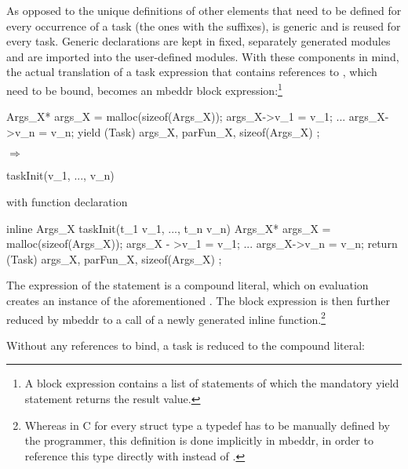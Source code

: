 As opposed to the unique definitions of other elements that need to be defined for every occurrence of a task (the ones with the  suffixes),  is generic and is reused for every task. Generic declarations are kept in fixed, separately generated modules and are imported into the user-defined modules.
With these components in mind, the actual translation of a task expression  that contains references  to , which need to be bound, becomes an mbeddr block expression:\footnote{A block expression contains a list of statements of which the mandatory yield statement returns the result value.}

\begin{center}
\begin{minipage}{0.4\textwidth}
\begin{ccode}
{
  Args_X* args_X = malloc(sizeof(Args_X));
  args_X->v_1 = v_1;
  ...
  args_X->v_n = v_n;
  yield (Task){ args_X, parFun_X, 
               sizeof(Args_X) };
}
\end{ccode}
\end{minipage}
\begin{minipage}{0.1\textwidth}
\quad$\Longrightarrow$\qquad
\end{minipage}
\begin{minipage}{0.4\textwidth}
\begin{ccode}
taskInit(v_1, ..., v_n)
\end{ccode}
with function declaration
\begin{ccode}
inline Args_X taskInit(t_1 v_1, ..., t_n v_n) {
  Args_X* args_X = malloc(sizeof(Args_X));
  args_X - >v_1 = v_1;
  ...
  args_X->v_n = v_n;
  return (Task){ args_X, parFun_X, 
                sizeof(Args_X) };
}
\end{ccode}
\end{minipage}
\end{center}

The expression of the  statement is a compound literal, which on evaluation creates an instance of the aforementioned . The block expression is then further reduced by mbeddr to a call of a newly generated inline function.\footnote{Whereas in C for every struct type  a typedef has to be manually defined by the programmer, this definition is done implicitly in mbeddr, in order to reference this type directly with  instead of .}

Without any references to bind, a task is reduced to the compound literal:

